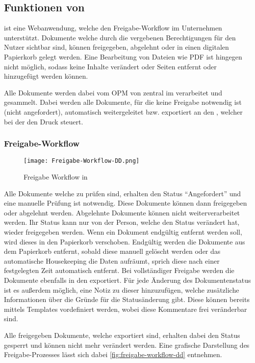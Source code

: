 \subsection{Funktionen von \docdesk{}}
\docdesk{} ist eine Webanwendung, welche den Freigabe-Workflow im Unternehmen unterstützt.
Dokumente welche durch die vergebenen Berechtigungen für den Nutzer sichtbar sind,
können freigegeben, abgelehnt oder in einen digitalen Papierkorb gelegt werden.
Eine Bearbeitung von Dateien wie PDF ist hingegen nicht möglich, sodass keine Inhalte verändert oder Seiten entfernt oder hinzugefügt werden können.

Alle Dokumente werden dabei vom \acrshort{OPM} von \compart{} zentral im \doccollect{} verarbeitet und gesammelt.
Dabei werden alle Dokumente, für die keine Freigabe notwendig ist (nicht angefordert),
automatisch weitergeleitet bzw. exportiert an den \pilot{}, welcher bei der \mediserv{} den Druck steuert.
\subsubsection{Freigabe-Workflow}
\label{sec:approval-workflow-dd}
\begin{figure}[htbp]
    \centering
    \texttt{[image: Freigabe-Workflow-DD.png]}
    \caption{Freigabe Workflow in \docdesk{}}
    \label{fig:freigabe-workflow-dd}
\end{figure}

Alle Dokumente welche zu prüfen sind, erhalten den Status "`Angefordert"' und eine manuelle Prüfung ist notwendig.
Diese Dokumente können dann freigegeben oder abgelehnt werden.
Abgelehnte Dokumente können nicht weiterverarbeitet werden.
Ihr Status kann nur von der Person, welche den Status verändert hat, wieder freigegeben werden.
Wenn ein Dokument endgültig entfernt werden soll, wird dieses in den Papierkorb verschoben.
Endgültig werden die Dokumente aus dem Papierkorb entfernt, sobald diese manuell gelöscht werden oder das automatische Housekeeping die Daten aufräumt,
sprich diese nach einer festgelegten Zeit automatisch entfernt.
Bei vollständiger Freigabe werden die Dokumente ebenfalls in den \pilot{} exportiert.
Für jede Änderung des Dokumentenstatus ist es außerdem möglich, eine Notiz zu dieser hinzuzufügen,
welche zusätzliche Informationen über die Gründe für die Statusänderung gibt.
Diese können bereits mittels Templates vordefiniert werden, wobei diese Kommentare frei veränderbar sind.

Alle freigegeben Dokumente, welche exportiert sind, erhalten dabei den Status gesperrt und können nicht mehr verändert werden.
Eine grafische Darstellung des Freigabe-Prozesses lässt sich dabei \autoref{fig:freigabe-workflow-dd} entnehmen. 


